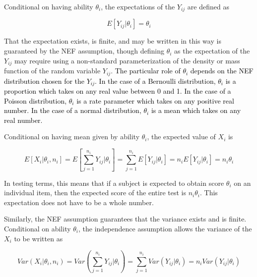 \documentclass[12pt,epsfig]{article}
\newcommand{\change}[1]{\textcolor{black}{#1}}
\begin{document}

Conditional on having ability $\theta_i$, the expectations of the $Y_{ij}$ are defined as

\begin{equation*}
E[Y_{ij} | \theta_i] = \theta_i
\end{equation*}

\noindent That the expectation exists, is finite, and may be written in this way is guaranteed by the NEF assumption, though defining $\theta_i$ as the expectation of the $Y_{ij}$ may require using a non-standard parameterization of the density or mass function of the random variable $Y_{ij}$. \change{The particular role of $\theta_i$ depends on the NEF distribution chosen for the $Y_{ij}$. In the case of a Bernoulli distribution, $\theta_i$ is a proportion which takes on any real value between 0 and 1. In the case of a Poisson distribution, $\theta_i$ is a rate parameter which takes on any positive real number. In the case of a normal distribution, $\theta_i$ is a mean which takes on any real number.} 

 Conditional on having mean given by ability $\theta_i$, the expected value of $X_i$ is


\begin{equation}
E[X_i | \theta_i, n_i] = E\left[\displaystyle \sum_{j = 1}^{n_i} Y_{ij} \biggr | \theta_i \right] = \displaystyle \sum_{j = 1}^{n_i} E\left[ Y_{ij} \biggr | \theta_i \right] = n_i E[Y_{ij}| \theta_i] = n_i \theta_i
\label{Eq:ConditionalExpectation}
\end{equation} 


\noindent In testing terms, this means that if a subject is expected to obtain score $\theta_i$ on an individual item, then the expected score of the entire test is $n_i \theta_i$. This expectation does not have to be a whole number.


Similarly, the NEF assumption guarantees that the variance exists and is finite. Conditional on ability $\theta_i$, the independence assumption allows the variance of the $X_i$ to be written as


\begin{equation*}
Var(X_i | \theta_i, n_i) = Var\left(\displaystyle \sum_{j = 1}^{n_i} Y_{ij} \biggr | \theta_i \right) = \displaystyle \sum_{j = 1}^{n_i} Var\left( Y_{ij} \biggr | \theta_i \right) = n_i Var(Y_{ij}| \theta_i)%
\label{Eq:ConditionalVariance}
\end{equation*}
\end{document}
